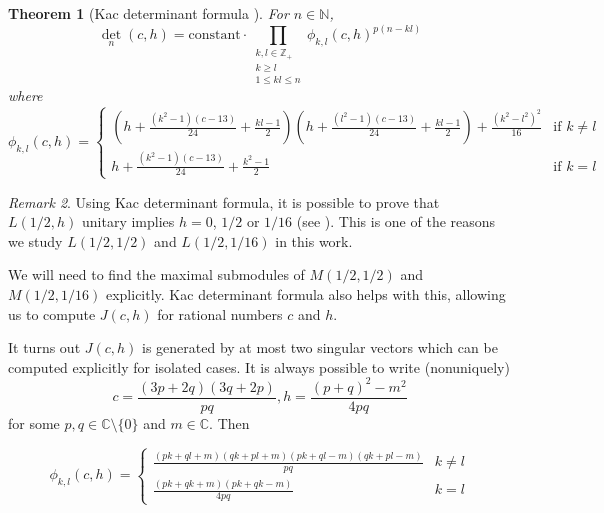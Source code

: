 \documentclass[a4paper, 12pt, reqno]{amsart}
\newtheorem{theorem}{Theorem}[subsection]
\theoremstyle{remark}
\newtheorem{remark}[theorem]{Remark}
\numberwithin{equation}{subsection}
\begin{document}
\begin{theorem}[Kac determinant formula {\cite[Theorem 4.2]{iohara_representation_2011}}]
  \label{thr:29}
  For $n \in \mathbb{N}$,
  \begin{equation*}
    \textstyle\det_n(c, h) = \displaystyle\text{constant}\cdot \prod_{\substack{k, l \in \mathbb{Z}_+\\k \ge l\\ 1 \le kl \le n}} \phi_{k, l}(c, h)^{p(n - kl)}
  \end{equation*}
  where
  \begin{equation*}
    \phi_{k, l}(c, h)=
    \begin{cases}
      (h + \frac{(k^2 - 1)(c - 13)}{24} + \frac{kl - 1}{2})(h + \frac{(l^2 - 1)(c - 13)}{24} + \frac{kl - 1}{2}) + \frac{(k^2 - l^2)^2}{16} & \text{if }k \neq l\\
      h + \frac{(k^2 - 1)(c - 13)}{24} + \frac{k^2 - 1}{2} & \text{if }k = l
    \end{cases}
  \end{equation*}
\end{theorem}

\begin{remark}
  \label{rmk:23}
  Using Kac determinant formula, it is possible to prove that $L(1/2, h)$ unitary implies $h = 0$, $1/2$ or $1/16$ (see \cite[\S3]{kac_bombay_2013}).
  This is one of the reasons we study $L(1/2, 1/2)$ and $L(1/2, 1/16)$ in this work.
\end{remark}

We will need to find the maximal submodules of $M(1/2, 1/2)$ and $M(1/2, 1/16)$ explicitly.
Kac determinant formula also helps with this, allowing us to compute $J(c, h)$ for rational numbers $c$ and $h$.

It turns out $J(c, h)$ is generated by at most two singular vectors which can be computed explicitly for isolated cases.
It is always possible to write (nonuniquely)
\begin{equation*}
  c = \frac{(3p + 2q)(3q + 2p)}{pq}, h = \frac{(p + q)^2 - m^2}{4pq}
\end{equation*}
for some $p,q\in \mathbb{C}\setminus\{0\}$ and $m\in \mathbb{C}$.
Then

\begin{equation*}
  \phi_{k, l}(c, h) =
  \begin{cases}
    \frac{(pk + ql + m)(qk + pl + m)(pk + ql - m)(qk + pl - m)}{pq} & k \neq l\\
    \frac{(pk + qk + m)(pk + qk - m)}{4pq} & k = l
  \end{cases}
\end{equation*}
\end{document}

